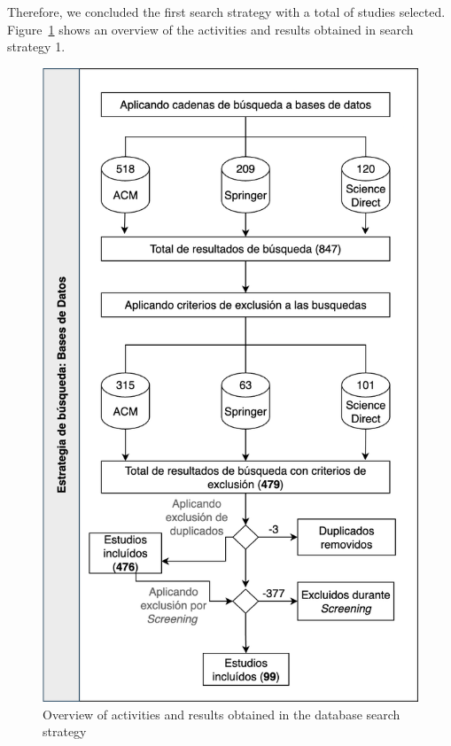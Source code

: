 Therefore, we concluded the first search strategy with a total of \screenTot{} studies selected. Figure~\ref{fig:overview} shows an overview of the activities and results obtained in search strategy 1.

\begin{figure}[htbp]
	\centering
	\includegraphics[scale=0.25]{resources/figures/overview.png}
	\caption{Overview of activities and results obtained in the database search strategy}
	\label{fig:overview}
\end{figure}


